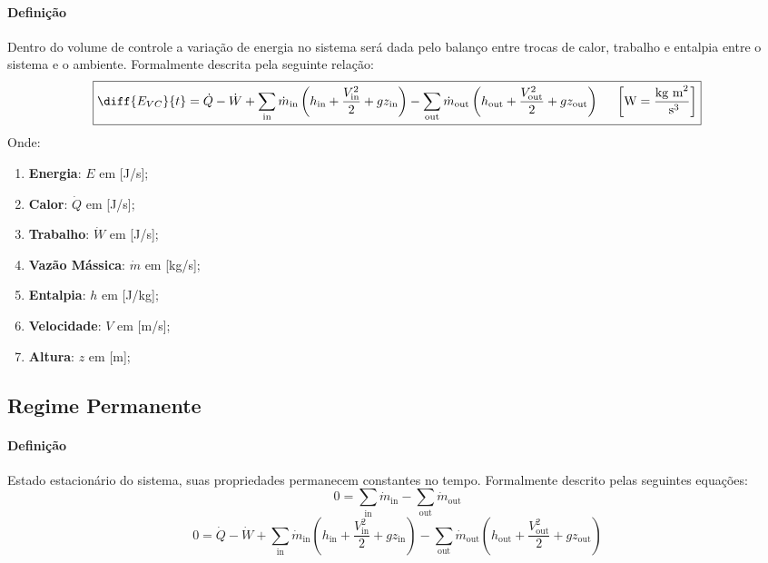 \documentclass{article}
\begin{document}
            \paragraph{Definição}Dentro do volume de controle a variação de energia no sistema será dada pelo balanço entre trocas de calor, trabalho e entalpia entre o sistema e o ambiente. Formalmente descrita pela seguinte relação:
                \[\boxed{
                    \diff{E_{VC}}{t} = \dot{Q} -
                                       \dot{W} +
                                       \sum_\text{in} \dot{m}_\text{in} \left(h_\text{in}  + \frac{V^{2}_\text{in}}{2}  + gz_\text{in}\right) -
                                       \sum_\text{out}\dot{m}_\text{out}\left(h_\text{out} + \frac{V^{2}_\text{out}}{2} + gz_\text{out}\right)
                                       \hspace{5mm} \left[\text{W} = \frac{\text{kg m}^{2}}{\text{ s}^{3}}\right]}\]
            Onde:
                \begin{enumerate}[noitemsep]
                    \item \textbf{Energia}: $E$ em [J/s];
                    \item \textbf{Calor}: $\dot{Q}$ em [J/s];
                    \item \textbf{Trabalho}: $\dot{W}$ em [J/s];
                    \item \textbf{Vazão Mássica}: $\dot{m}$ em [kg/s];
                    \item \textbf{Entalpia}: $h$ em [J/kg];
                    \item \textbf{Velocidade}: $V$ em [m/s];
                    \item \textbf{Altura}: $z$ em [m];
                \end{enumerate}

        \subsection{Regime Permanente}
            \paragraph{Definição}Estado estacionário do sistema, suas propriedades permanecem constantes no tempo. Formalmente descrito pelas seguintes equações:
                \[\boxed{
                    0 = \sum_\text{in}\dot{m}_\text{in} - \sum_\text{out}\dot{m}_\text{out}}\]
                \[\boxed{
                    0 = \dot{Q} -
                        \dot{W} +
                        \sum_\text{in} \dot{m}_\text{in} \left(h_\text{in}  + \frac{V^{2}_\text{in}}{2}  + gz_\text{in}\right) -
                        \sum_\text{out}\dot{m}_\text{out}\left(h_\text{out} + \frac{V^{2}_\text{out}}{2} + gz_\text{out}\right)}\]
\newpage
\end{document}
